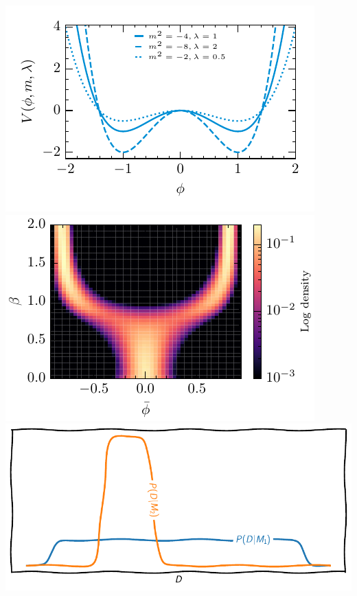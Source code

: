 \documentclass[aspectratio=169,handout]{beamer}
\begin{document}
\begin{frame}
\begin{columns}
    \end{columns}
    \includegraphics[height=0.2\textwidth]{figures/potential_shape}%
    \includegraphics[height=0.2\textwidth]{figures/2d_phase}%
    \includegraphics[height=0.2\textwidth]{figures/popper}
\end{frame}
\end{document}
